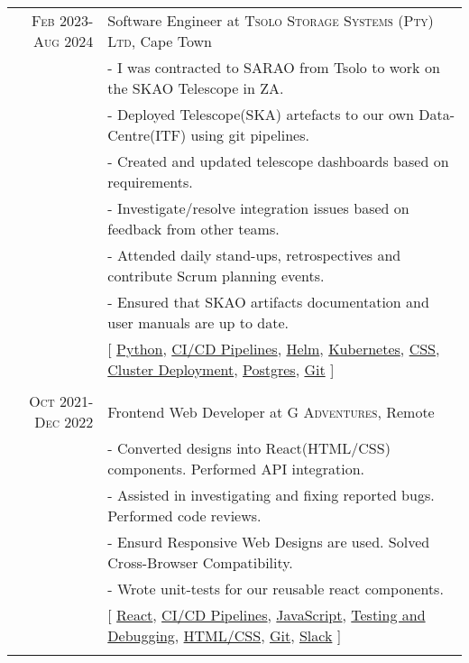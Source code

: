 \documentclass[a4paper,10pt]{article} %
\begin{document}
\begin{tabular}{r|p{15cm}}
\textsc{Feb 2023-Aug 2024} & Software Engineer at \textsc{Tsolo Storage Systems (Pty) Ltd}, Cape Town \emph{}\\
& \footnotesize{- I was contracted to SARAO from Tsolo to work on the SKAO Telescope in ZA.}\\
& \footnotesize{- Deployed Telescope(SKA) artefacts to our own Data-Centre(ITF) using git pipelines.}\\
& \footnotesize{- Created and updated telescope dashboards based on requirements.}\\
& \footnotesize{- Investigate/resolve integration issues based on feedback from other teams.}\\
& \footnotesize{- Attended daily stand-ups, retrospectives and contribute Scrum planning events.}\\
& \footnotesize{- Ensured that SKAO artifacts documentation and user manuals are up to date.}\\
& \footnotesize{[ \href{https://www.python.org/}{Python}, \href{https://github.com/solutions/ci-cd}{CI/CD Pipelines}, \href{https://helm.sh/}{Helm}, \href{https://kubernetes.io/}{Kubernetes}, \href{https://datatracker.ietf.org/doc/html/rfc7993}{CSS}, \href{https://kubernetes.io/docs/concepts/workloads/controllers/deployment/}{Cluster Deployment}, \href{https://www.postgresql.org/}{Postgres}, \href{https://git-scm.com/}{Git}   ]}\\
\multicolumn{2}{c}{} \\


\textsc{Oct 2021-Dec 2022} & Frontend Web Developer at \textsc{G Adventures}, Remote \emph{}\\
& \footnotesize{- Converted designs into React(HTML/CSS) components. Performed API integration.}\\
& \footnotesize{- Assisted in investigating and fixing reported bugs. Performed code reviews.}\\
& \footnotesize{- Ensurd Responsive Web Designs are used. Solved Cross-Browser Compatibility.}\\
& \footnotesize{- Wrote unit-tests for our reusable react components.}\\
& \footnotesize{[ \href{https://react.dev/}{React}, \href{https://github.com/solutions/ci-cd}{CI/CD Pipelines}, \href{https://developer.mozilla.org/en-US/docs/Web/JavaScript}{JavaScript}, \href{https://jestjs.io/}{Testing and Debugging}, \href{https://datatracker.ietf.org/doc/html/rfc7993}{HTML/CSS}, \href{https://git-scm.com/}{Git}, \href{https://slack.com/}{Slack} ]}\\
\multicolumn{2}{c}{} \\


\end{tabular}
\end{document}
